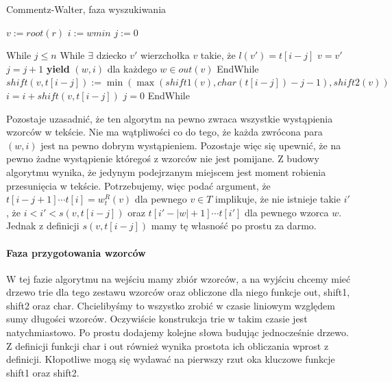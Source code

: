 \begin{algorithm}
\caption{Commentz-Walter, faza wyszukiwania}\label{euclid}
\begin{algorithmic}
 
\State $v := root(r)$ 
\State $i := wmin$ 
\State $j := 0$ 

\State While{ $j \leq n$ }
    \State While {$\exists$ dziecko $v'$ wierzchołka $v$ takie, że $l(v')=t[i-j]$} 
        \State $v = v'$
        \State $j = j + 1$
        \State \textbf{yield} $(w, i)$ dla każdego $w \in out(v)$
    \State EndWhile
\State $shift(v, t[i-j]) := \min(\max(shift1(v), char(t[i-j])-j-1), shift2(v))$
\State $i = i + shift(v, t[i-j])$ 
\State $j = 0$
\State EndWhile
\EndProcedure
\end{algorithmic}
\end{algorithm}

Pozostaje uzasadnić, że ten algorytm na pewno zwraca wszystkie wystąpienia wzorców w tekście. Nie ma wątpliwości co do tego, że każda zwrócona para $(w, i)$ jest na pewno dobrym wystąpieniem. Pozostaje więc się upewnić, że na pewno żadne wystąpienie któregoś z wzorców nie jest pomijane. Z budowy algorytmu wynika, że jedynym podejrzanym miejscem jest moment robienia przesunięcia w tekście. Potrzebujemy, więc podać argument, że $t[i-j+1]\cdots t[i] = w_t^R(v)$ dla pewnego $v \in T$ implikuje, że nie istnieje takie $i'$, że $i < i' < s(v, t[i-j])$ oraz $t[i'-|w|+1]\cdots t[i']$ dla pewnego wzorca $w$. Jednak z definicji $s(v, t[i-j])$ mamy tę własność po prostu za darmo.

\paragraph{Faza przygotowania wzorców}
W tej fazie algorytmu na wejściu mamy zbiór wzorców, a na wyjściu chcemy mieć drzewo trie dla tego zestawu wzorców oraz obliczone dla niego funkcje out, shift1, shift2 oraz char. Chcielibyśmy to wszystko zrobić w czasie liniowym względem sumy długości wzorców. Oczywiście konstrukcja trie w takim czasie jest natychmiastowo. Po prostu dodajemy kolejne słowa budując jednocześnie drzewo. Z definicji funkcji char i out również wynika prostota ich obliczania wprost z definicji. Kłopotliwe mogą się wydawać na pierwszy rzut oka kluczowe funkcje shift1 oraz shift2.


